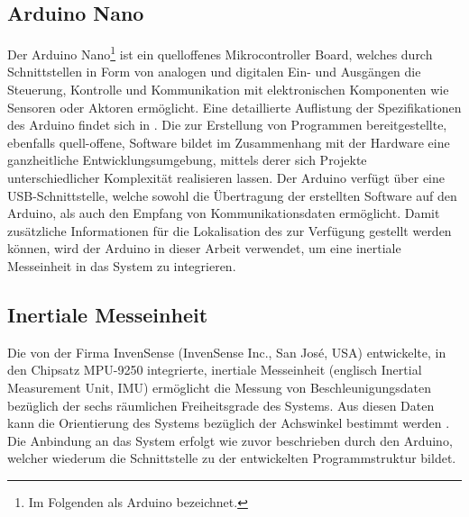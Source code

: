 
\prever{
}

\subsection{Arduino\textsuperscript{\texttrademark} Nano}
\label{chap.arduino}
Der Arduino\textsuperscript{\texttrademark} Nano\footnote{Im Folgenden als Arduino bezeichnet.} ist ein quelloffenes Mikrocontroller Board, welches durch Schnittstellen in Form von analogen und digitalen Ein- und Ausgängen die Steuerung, Kontrolle und Kommunikation mit elektronischen Komponenten wie Sensoren oder Aktoren ermöglicht. Eine detaillierte Auflistung der Spezifikationen des Arduino findet sich in . Die zur Erstellung von Programmen bereitgestellte, ebenfalls quell-offene, Software bildet im Zusammenhang mit der Hardware eine ganzheitliche Entwicklungsumgebung, mittels derer sich Projekte unterschiedlicher Komplexität realisieren lassen. Der Arduino verfügt über eine USB-Schnittstelle, welche sowohl die Übertragung der erstellten Software auf den Arduino, als auch den Empfang von Kommunikationsdaten ermöglicht. Damit zusätzliche Informationen für die Lokalisation des  zur Verfügung gestellt werden können, wird der Arduino in dieser Arbeit verwendet, um eine inertiale Messeinheit in das System zu integrieren.

\prever{
}


\subsection{Inertiale Messeinheit}
\label{chap.imu}
Die von der Firma InvenSense (InvenSense Inc., San Jos\'e, USA) entwickelte, in den Chipsatz MPU-9250 integrierte, inertiale Messeinheit (englisch Inertial Measurement Unit, IMU) ermöglicht die Messung von Beschleunigungsdaten bezüglich der sechs räumlichen Freiheitsgrade des Systems. Aus diesen Daten kann die Orientierung des Systems bezüglich der Achswinkel bestimmt werden \cite{IMU}. Die Anbindung an das System erfolgt wie zuvor beschrieben durch den Arduino, welcher wiederum die Schnittstelle zu der entwickelten Programmstruktur bildet.
\prever{
}

